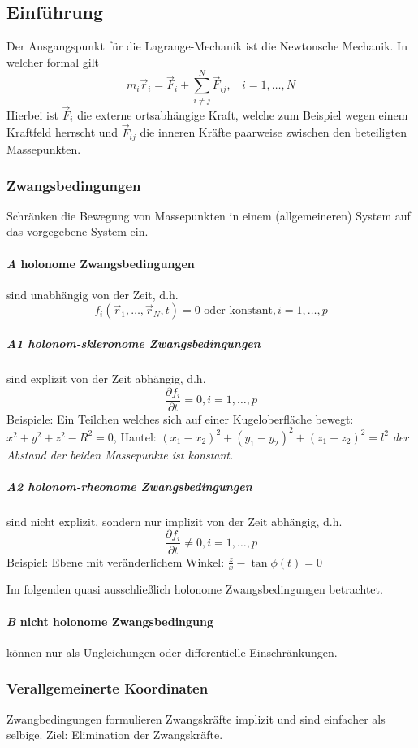 \documentclass[oneside]{book}
\theoremstyle{definition}
\newcommand{\ddotvec}[1]{\ddot{\vec{#1}}}
\begin{document}
\subsection{Einführung}
Der Ausgangspunkt für die Lagrange-Mechanik ist die Newtonsche Mechanik. In welcher formal gilt
$$ m_i \ddotvec{r}_i = \vec{F}_i + \sum_{i \neq j}^{N} \vec{F}_{ij}, ~~~~i = 1, \dots, N$$
Hierbei ist $\vec{F}_i$ die externe ortsabhängige Kraft, welche zum Beispiel wegen einem Kraftfeld herrscht und $\vec{F}_{ij}$ die inneren Kräfte paarweise zwischen den beteiligten Massepunkten.

\subsubsection{Zwangsbedingungen} 
Schränken die Bewegung von Massepunkten in einem (allgemeineren) System auf das vorgegebene System ein.

\paragraph{\textit{A} holonome Zwangsbedingungen}  sind unabhängig von der Zeit, d.h. $$f_i(\vec{r}_1, \dots, \vec{r}_N, t) = 0 \text{~oder konstant}, i = 1, \dots, p$$ 

\subparagraph{\textit{A1} holonom-skleronome Zwangsbedingungen} sind explizit von der Zeit abhängig, d.h.
$$ \frac{\partial f_i}{\partial t} = 0, i = 1, \dots, p$$
Beispiele: Ein Teilchen welches sich auf einer Kugeloberfläche bewegt: $x^2 + y^2 + z^2 - R^2 = 0$, Hantel: $(x_1 - x_2)^2 + (y_1 - y_2)^2 + (z_1 + z_2)^2 = l^2$ \textit{der Abstand der beiden Massepunkte ist konstant.}

\subparagraph{\textit{A2} holonom-rheonome Zwangsbedingungen} sind nicht explizit, sondern nur implizit von der Zeit abhängig, d.h.
$$ \frac{\partial f_i}{\partial t} \neq 0, i = 1, \dots, p$$
Beispiel: Ebene mit veränderlichem Winkel: $\frac{z}{x} - \tan{\phi(t)} = 0$

Im folgenden quasi ausschließlich holonome Zwangsbedingungen betrachtet.

\paragraph{\textit{B} nicht holonome Zwangsbedingung} können nur als Ungleichungen oder differentielle Einschränkungen.

\subsubsection{Verallgemeinerte Koordinaten}
Zwangbedingungen formulieren Zwangskräfte implizit und sind einfacher als selbige. Ziel: Elimination der Zwangskräfte.
\end{document}
